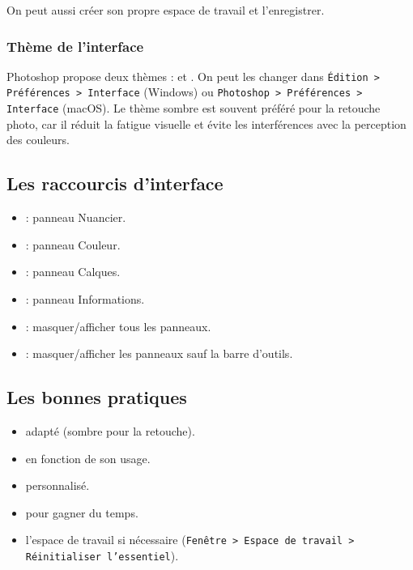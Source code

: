 On peut aussi créer son propre espace de travail et l'enregistrer.

\subsubsection{Thème de l'interface}

Photoshop propose deux thèmes :  et . On peut les changer dans \texttt{Édition > Préférences > Interface} (Windows) ou \texttt{Photoshop > Préférences > Interface} (macOS). Le thème sombre est souvent préféré pour la retouche photo, car il réduit la fatigue visuelle et évite les interférences avec la perception des couleurs.

\subsection{Les raccourcis d'interface}

\begin{itemize}
    \item {} : panneau Nuancier.
    \item {} : panneau Couleur.
    \item {} : panneau Calques.
    \item {} : panneau Informations.
    \item {} : masquer/afficher tous les panneaux.
    \item {} : masquer/afficher les panneaux sauf la barre d'outils.
\end{itemize}

\subsection{Les bonnes pratiques}

\begin{itemize}
    \item {} adapté (sombre pour la retouche).
    \item {} en fonction de son usage.
    \item {} personnalisé.
    \item {} pour gagner du temps.
    \item {} l'espace de travail si nécessaire (\texttt{Fenêtre > Espace de travail > Réinitialiser l'essentiel}).
\end{itemize}

